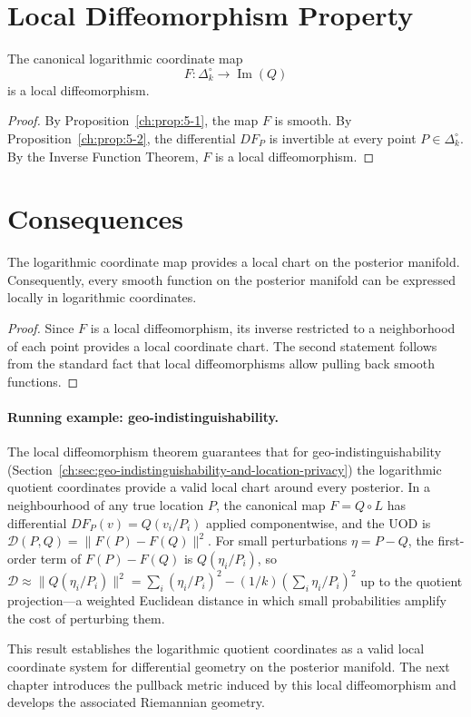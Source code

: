 \section{Local Diffeomorphism Property}\label{ch:sec:local-diffeomorphism-property}
\begin{theorem}
\label{ch:thm:5-4}
The canonical logarithmic coordinate map
\[
F : \Delta_k^\circ \longrightarrow \operatorname{Im}(Q)
\]
is a local diffeomorphism.
\end{theorem}
\begin{proof}
By Proposition~\ref{ch:prop:5-1}, the map \(F\) is smooth.
By Proposition~\ref{ch:prop:5-2}, the differential \(DF_P\) is invertible at every point \(P \in \Delta_k^\circ\).
By the Inverse Function Theorem, \(F\) is a local diffeomorphism. 
\end{proof}
\section{Consequences}\label{ch:sec:consequences-diffeomorphism_local}
\begin{corollary}
\label{ch:cor:5-5}
The logarithmic coordinate map provides a local chart on the posterior manifold. Consequently, every smooth function on the posterior manifold can be expressed locally in logarithmic coordinates.
\end{corollary}
\begin{proof}
Since \(F\) is a local diffeomorphism, its inverse restricted to a neighborhood of each point provides a local coordinate chart.
The second statement follows from the standard fact that local diffeomorphisms allow pulling back smooth functions. 
\end{proof}

\paragraph{Running example: geo-indistinguishability.}
The local diffeomorphism theorem guarantees that for geo-indistinguishability (Section~\ref{ch:sec:geo-indistinguishability-and-location-privacy}) the logarithmic quotient coordinates provide a valid local chart around every posterior.  In a neighbourhood of any true location $P$, the canonical map $F=Q\circ L$ has differential $DF_P(v)=Q(v_i/P_i)$ applied componentwise, and the UOD is $\mathcal D(P,Q)=\|F(P)-F(Q)\|^2$.  For small perturbations $\eta=P-Q$, the first-order term of $F(P)-F(Q)$ is $Q(\eta_i/P_i)$, so $\mathcal D\approx\|Q(\eta_i/P_i)\|^2=\sum_i (\eta_i/P_i)^2-(1/k)(\sum_i \eta_i/P_i)^2$ up to the quotient projection---a weighted Euclidean distance in which small probabilities amplify the cost of perturbing them.

This result establishes the logarithmic quotient coordinates as a valid local coordinate system for differential geometry on the posterior manifold. The next chapter introduces the pullback metric induced by this local diffeomorphism and develops the associated Riemannian geometry.
